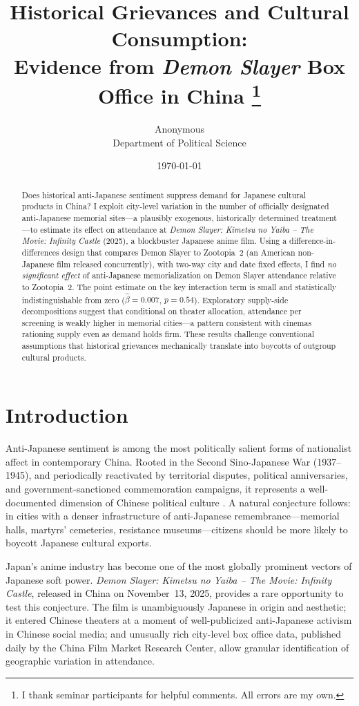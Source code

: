 \documentclass[12pt]{article}
\title{Historical Grievances and Cultural Consumption:\\
Evidence from \textit{Demon Slayer} Box Office in China%
\thanks{I thank seminar participants for helpful comments. All errors are my own.}}
\author{Anonymous\\
\small Department of Political Science}
\date{\today}
\begin{document}
\maketitle

\begin{abstract}
Does historical anti-Japanese sentiment suppress demand for Japanese cultural products in China? I exploit city-level variation in the number of officially designated anti-Japanese memorial sites---a plausibly exogenous, historically determined treatment---to estimate its effect on attendance at \textit{Demon Slayer: Kimetsu no Yaiba -- The Movie: Infinity Castle} (2025), a blockbuster Japanese anime film. Using a difference-in-differences design that compares Demon Slayer to Zootopia~2 (an American non-Japanese film released concurrently), with two-way city and date fixed effects, I find \emph{no significant effect} of anti-Japanese memorialization on Demon Slayer attendance relative to Zootopia~2. The point estimate on the key interaction term is small and statistically indistinguishable from zero ($\hat{\beta} = 0.007$, $p = 0.54$). Exploratory supply-side decompositions suggest that conditional on theater allocation, attendance per screening is weakly higher in memorial cities---a pattern consistent with cinemas rationing supply even as demand holds firm. These results challenge conventional assumptions that historical grievances mechanically translate into boycotts of outgroup cultural products.
\end{abstract}

\newpage

\section{Introduction}

Anti-Japanese sentiment is among the most politically salient forms of nationalist affect in contemporary China. Rooted in the Second Sino-Japanese War (1937--1945), and periodically reactivated by territorial disputes, political anniversaries, and government-sanctioned commemoration campaigns, it represents a well-documented dimension of Chinese political culture \citep{wang2012,weiss2014,shirk2007}. A natural conjecture follows: in cities with a denser infrastructure of anti-Japanese remembrance---memorial halls, martyrs' cemeteries, resistance museums---citizens should be more likely to boycott Japanese cultural exports.

Japan's anime industry has become one of the most globally prominent vectors of Japanese soft power. \textit{Demon Slayer: Kimetsu no Yaiba -- The Movie: Infinity Castle}, released in China on November~13, 2025, provides a rare opportunity to test this conjecture. The film is unambiguously Japanese in origin and aesthetic; it entered Chinese theaters at a moment of well-publicized anti-Japanese activism in Chinese social media; and unusually rich city-level box office data, published daily by the China Film Market Research Center, allow granular identification of geographic variation in attendance.
\end{document}
